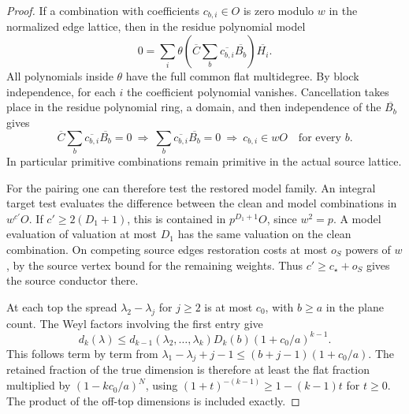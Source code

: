 \begin{proof}
If a combination with coefficients \(c_{b,i}\in O\) is
zero modulo \(w\) in the normalized edge lattice, then in the
residue polynomial model
\[
 0=\sum_i\theta\left(\overline C\sum_b\overline{c_{b,i}}\overline{B_b}\right)
                    \overline{H_i}.
\]
All polynomials inside \(\theta\) have the full common flat
multidegree. By block independence, for each \(i\) the coefficient polynomial
vanishes. Cancellation takes place in the residue polynomial ring,
a domain, and then independence of the \(\overline{B_b}\) gives
\[
 \overline C\sum_b\overline{c_{b,i}}\overline{B_b}=0
 \ \Longrightarrow\ \sum_b\overline{c_{b,i}}\overline{B_b}=0
 \ \Longrightarrow\ c_{b,i}\in wO\quad\text{for every }b .
\] In particular primitive combinations remain primitive
in the actual source lattice.

For the pairing one can therefore test the restored model family.
An integral target test evaluates the difference between the clean
and model combinations in \(w^{c'}O\). If \(c'\ge 2(D_1+1)\), this
is contained in \(p^{D_1+1}O\), since \(w^2=p\). A model evaluation
of valuation at most \(D_1\) has the same valuation on the clean
combination. On competing source edges restoration costs at most
\(o_S\) powers of \(w\), by the source vertex bound for the remaining
weights. Thus \(c'\ge c_\star+o_S\) gives the source conductor there.

At each top the spread \(\lambda_2-\lambda_j\) for \(j\ge2\)
is at most \(c_0\), with \(b\ge a\) in the plane count.
The Weyl factors involving the first entry give
\[
 d_k(\lambda)\le d_{k-1}(\lambda_2,\ldots,\lambda_k)D_k(b)
                  (1+c_0/a)^{k-1}.
\]
This follows term by term from
\(\lambda_1-\lambda_j+j-1\le (b+j-1)(1+c_0/a)\).
The retained fraction of the true dimension is therefore at
least the flat fraction multiplied by \((1-kc_0/a)^N\), using
\((1+t)^{-(k-1)}\ge1-(k-1)t\) for \(t\ge0\). The product of
the off-top dimensions is included exactly.
\end{proof}

